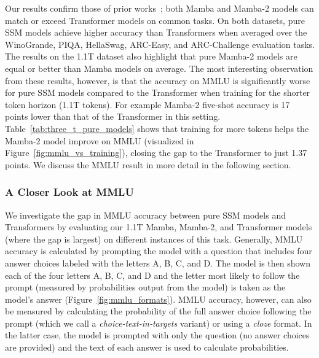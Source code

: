 Our results confirm those of prior works~\citep{dao2024transformers}; both Mamba and Mamba-2 models can match or exceed Transformer models on common tasks. On both datasets, pure SSM models achieve higher accuracy than Transformers when averaged over the WinoGrande, PIQA, HellaSwag, ARC-Easy, and ARC-Challenge evaluation tasks. The results on the 1.1T dataset also highlight that pure Mamba-2 models are equal or better than Mamba models on average. The most interesting observation from these results, however, is that the accuracy on MMLU is significantly worse for pure SSM models compared to the Transformer when training for the shorter token horizon (1.1T tokens). For example Mamba-2 five-shot accuracy is 17 points lower than that of the Transformer in this setting. Table~\ref{tab:three_t_pure_models} shows that training for more tokens helps the Mamba-2 model improve on MMLU (visualized in Figure~\ref{fig:mmlu_vs_training}), closing the gap to the Transformer to just 1.37 points. We discuss the MMLU result in more detail in the following section.

\subsubsection{A Closer Look at MMLU}
\label{subsubsec:mmlu_in_detail}

We investigate the gap in MMLU accuracy between pure SSM models and Transformers by evaluating our 1.1T Mamba, Mamba-2, and Transformer models (where the gap is largest) on different instances of this task. Generally, MMLU accuracy is calculated by prompting the model with a question that includes four answer choices labeled with the letters A, B, C, and D. The model is then shown each of the four letters A, B, C, and D and the letter most likely to follow the prompt (measured by probabilities output from the model) is taken as the model's answer (Figure~\ref{fig:mmlu_formats}). MMLU accuracy, however, can also be measured by calculating the probability of the full answer choice following the prompt (which we call a \textit{choice-text-in-targets} variant) or using a \textit{cloze} format. In the latter case, the model is prompted with only the question (no answer choices are provided) and the text of each answer is used to calculate probabilities. 

